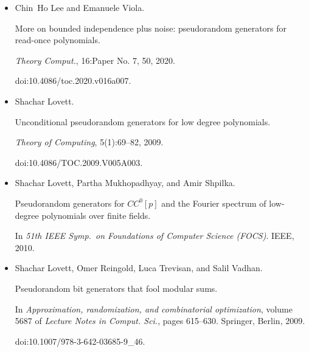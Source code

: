 \begin{itemize}
More on bounded independence plus noise: Pseudorandom generators for
read-once polynomials.


\emph{Theory of Computing}, 16:1–50, 2020.


Available at
https://www.ccs.neu.edu/home/viola/papers/LV-rop.pdf.


doi:10.4086/TOC.2020.V016A007.





\item[] 
[31]

Chin Ho Lee and Emanuele Viola.


More on bounded independence plus noise: pseudorandom generators for
read-once polynomials.


\emph{Theory Comput.}, 16:Paper No. 7, 50, 2020.


doi:10.4086/toc.2020.v016a007.





\item[] 
[32]

Shachar Lovett.


Unconditional pseudorandom generators for low degree polynomials.


\emph{Theory of Computing}, 5(1):69–82, 2009.


doi:10.4086/TOC.2009.V005A003.





\item[] 
[33]

Shachar Lovett, Partha Mukhopadhyay, and Amir Shpilka.


Pseudorandom generators for $CC^{0}[p]$ and the Fourier spectrum of
low-degree polynomials over finite fields.


In \emph{51th IEEE Symp. on Foundations of Computer Science (FOCS)}.
IEEE, 2010.





\item[] 
[34]

Shachar Lovett, Omer Reingold, Luca Trevisan, and Salil Vadhan.


Pseudorandom bit generators that fool modular sums.


In \emph{Approximation, randomization, and combinatorial
optimization}, volume 5687 of \emph{Lecture Notes in Comput. Sci.}, pages
615–630. Springer, Berlin, 2009.


doi:10.1007/978-3-642-03685-9\_46.






\end{itemize}
